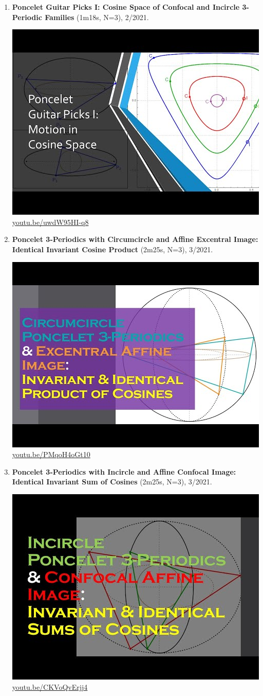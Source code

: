 \documentclass[12pt]{amsart}
\begin{document}
\begin{enumerate}[resume]
\item \textbf{Poncelet Guitar Picks I: Cosine Space of Confocal and Incircle 3-Periodic Families} (1m18s, N=3), 2/2021. 
\begin{center}\includegraphics[width=.5\textwidth]{pics/uwdW95HI-q8.jpg} \\ 
\href{https://youtu.be/uwdW95HI-q8}{\url{youtu.be/uwdW95HI-q8}}\end{center}
% 
\item \textbf{Poncelet 3-Periodics with Circumcircle and Affine Excentral Image: Identical Invariant Cosine Product} (2m25s, N=3), 3/2021. 
\begin{center}\includegraphics[width=.5\textwidth]{pics/PMqoH4oGt10.jpg} \\ 
\href{https://youtu.be/PMqoH4oGt10}{\url{youtu.be/PMqoH4oGt10}}\end{center}
% 
\item \textbf{Poncelet 3-Periodics with Incircle and Affine Confocal Image: Identical Invariant Sum of Cosines} (2m25s, N=3), 3/2021. 
\begin{center}\includegraphics[width=.5\textwidth]{pics/CKVoQvErjj4.jpg} \\ 
\href{https://youtu.be/CKVoQvErjj4}{\url{youtu.be/CKVoQvErjj4}}\end{center}
% 
\end{enumerate}
\end{document}
